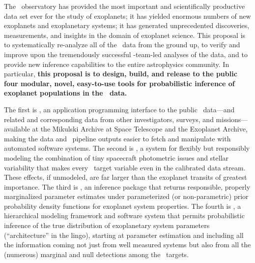 \documentclass[letterpaper,12pt]{article}
\newcommand{\kplr}{\package{kplr}}
\newcommand{\Untrendy}{\package{Untrendy}}
\newcommand{\Bart}{\package{Bart}}
\newcommand{\TheCreator}{\package{TheCreator}}
\begin{document}
The \Kepler\ observatory has provided the most important and
scientifically productive data set ever for the study of exoplanets;
it has yielded enormous numbers of new exoplanets and exoplanetary
systems; it has generated unprecedented discoveries, measurements, and
insights in the domain of exoplanet science.  This proposal is to
systematically re-analyze all of the \Kepler\ data from the ground up,
to verify and improve upon the tremendously successful
\Kepler-team-led analyses of the data, and to provide new inference
capabilities to the entire astrophysics community.  In particular,
\textbf{this proposal is to design, build, and release to the public
  four modular, novel, easy-to-use tools for probabilistic inference
  of exoplanet populations in the \Kepler\ data.}

The first is
\kplr, an application programming interface to the public
\Kepler\ data---and related and corresponding data from other
investigators, surveys, and missions---available at the Mikulski
Archive at Space Telescope and the Exoplanet Archive, making the data
and \Kepler\ pipeline outputs easier to fetch and manipulate with
automated software systems.  The second is \Untrendy, a system for
flexibly but responsibly modeling the combination of tiny spacecraft
photometric issues and stellar variability that makes every
\Kepler\ target variable even in the calibrated data stream.  These
effects, if unmodeled, are far larger than the exoplanet transits of
greatest importance.  The third is \Bart, an inference package that
returns responsible, properly marginalized parameter estimates under
parameterized (or non-parametric) prior probability density functions
for exoplanet system properties.  The fourth is \TheCreator, a
hierarchical modeling framework and software system that permits
probabilistic inference of the true distribution of exoplanetary
system parameters (``architecture'' in the lingo), starting at
parameter estimation and including all the information coming not just
from well measured systems but also from all the (numerous) marginal
and null detections among the \Kepler\ targets.
\end{document}
